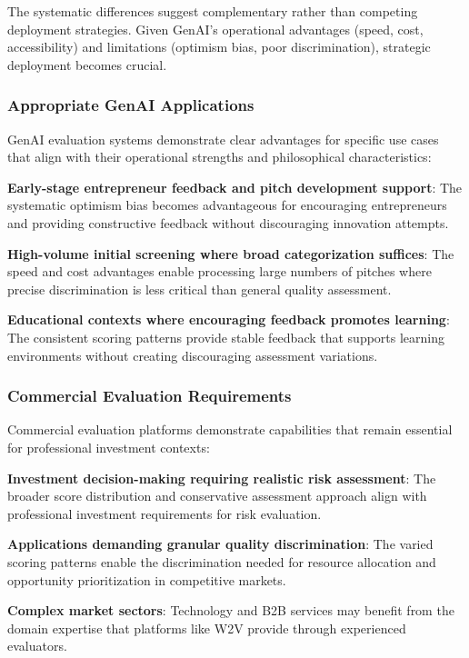 The systematic differences suggest complementary rather than competing deployment strategies. Given GenAI's operational advantages (speed, cost, accessibility) and limitations (optimism bias, poor discrimination), strategic deployment becomes crucial.

\subsubsection{Appropriate GenAI Applications}
\label{subsec:ai-applications}

GenAI evaluation systems demonstrate clear advantages for specific use cases that align with their operational strengths and philosophical characteristics:

\textbf{Early-stage entrepreneur feedback and pitch development support}: The systematic optimism bias becomes advantageous for encouraging entrepreneurs and providing constructive feedback without discouraging innovation attempts.

\textbf{High-volume initial screening where broad categorization suffices}: The speed and cost advantages enable processing large numbers of pitches where precise discrimination is less critical than general quality assessment.

\textbf{Educational contexts where encouraging feedback promotes learning}: The consistent scoring patterns provide stable feedback that supports learning environments without creating discouraging assessment variations.

\subsubsection{Commercial Evaluation Requirements}
\label{subsec:commercial-requirements}

Commercial evaluation platforms demonstrate capabilities that remain essential for professional investment contexts:

\textbf{Investment decision-making requiring realistic risk assessment}: The broader score distribution and conservative assessment approach align with professional investment requirements for risk evaluation.

\textbf{Applications demanding granular quality discrimination}: The varied scoring patterns enable the discrimination needed for resource allocation and opportunity prioritization in competitive markets.

\textbf{Complex market sectors}: Technology and B2B services may benefit from the domain expertise that platforms like W2V provide through experienced evaluators.

